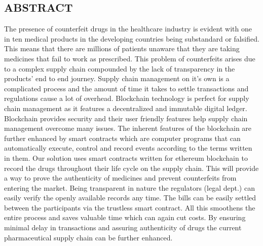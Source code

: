 \documentclass[12pt,a4paper]{report}
\begin{document}


\newpage
{}
\begin{center}
 \section*{\Large{\textbf{ABSTRACT}}}
\end{center}
\onehalfspacing

\hspace*{0.5cm}The presence of counterfeit drugs in the healthcare industry is evident with one in ten medical products in the developing
countries being substandard or falsified. This means that there are millions of patients unaware that they are taking medicines
that fail to work as prescribed. This problem of counterfeits arises due to a complex supply chain compounded by the lack
of transparency in the products’ end to end journey. Supply chain management on it’s own is a complicated process and
the amount of time it takes to settle transactions and regulations cause a lot of overhead. Blockchain technology is perfect
for supply chain management as it features a decentralized and immutable digital ledger. Blockchain provides security and
their user friendly features help supply chain management overcome many issues. The inherent features of the blockchain are
further enhanced by smart contracts which are computer programs that can automatically execute, control and record events
according to the terms written in them. Our solution uses smart contracts written for ethereum blockchain to record the drugs
throughout their life cycle on the supply chain. This will provide a way to prove the authenticity of medicines and prevent
counterfeits from entering the market. Being transparent in nature the regulators (legal dept.) can easily verify the openly
available records any time. The bills can be easily settled between the participants via the trustless smart contract. All this
smoothens the entire process and saves valuable time which can again cut costs. By ensuring minimal delay in transactions
and assuring authenticity of drugs the current pharmaceutical supply chain can be further enhanced.\par

\end{document}
